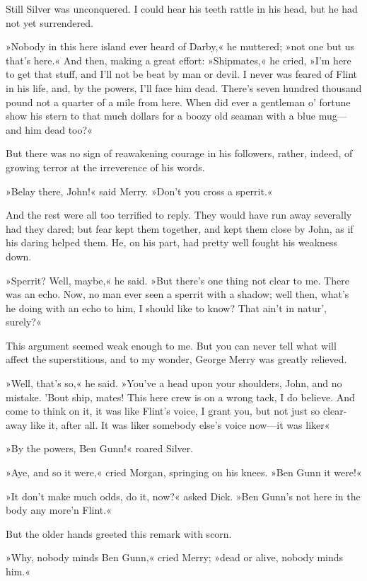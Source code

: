 Still Silver was unconquered. I could hear his teeth rattle in his head, but he had not yet surrendered.

»Nobody in this here island ever heard of Darby,« he muttered; »not one but us that's here.« And then, making a great effort: »Shipmates,« he cried, »I'm here to get that stuff, and I'll not be beat by man or devil. I never was feared of Flint in his life, and, by the powers, I'll face him dead. There's seven hundred thousand pound not a quarter of a mile from here. When did ever a gentleman o' fortune show his stern to that much dollars for a boozy old seaman with a blue mug—and him dead too?«

But there was no sign of reawakening courage in his followers, rather, indeed, of growing terror at the irreverence of his words.

»Belay there, John!« said Merry. »Don't you cross a sperrit.«

And the rest were all too terrified to reply. They would have run away severally had they dared; but fear kept them together, and kept them close by John, as if his daring helped them. He, on his part, had pretty well fought his weakness down.

»Sperrit? Well, maybe,« he said. »But there's one thing not clear to me. There was an echo. Now, no man ever seen a sperrit with a shadow; well then, what's he doing with an echo to him, I should like to know? That ain't in natur', surely?«

This argument seemed weak enough to me. But you can never tell what will affect the superstitious, and to my wonder, George Merry was greatly relieved.

»Well, that's so,« he said. »You've a head upon your shoulders, John, and no mistake. 'Bout ship, mates! This here crew is on a wrong tack, I do believe. And come to think on it, it was like Flint's voice, I grant you, but not just so clear-away like it, after all. It was liker somebody else's voice now—it was liker\longdash«

»By the powers, Ben Gunn!« roared Silver.

»Aye, and so it were,« cried Morgan, springing on his knees. »Ben Gunn it were!«

»It don't make much odds, do it, now?« asked Dick. »Ben Gunn's not here in the body any more'n Flint.«

But the older hands greeted this remark with scorn.

»Why, nobody minds Ben Gunn,« cried Merry; »dead or alive, nobody minds him.«

